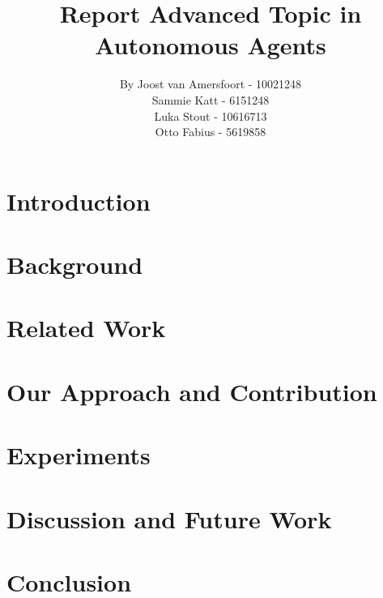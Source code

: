 \documentclass{article}
\title{Report Advanced Topic in Autonomous Agents}
\author{By Joost van Amersfoort - 10021248 \\ Sammie Katt - 6151248 \\ Luka Stout - 10616713 \\ Otto Fabius - 5619858}
\begin{document}
\maketitle
\tableofcontents
\newpage

\section{Introduction}


\section{Background}


\section{Related Work}


\section{Our Approach and Contribution}


\section{Experiments}


\section{Discussion and Future Work}


\section{Conclusion}

\end{document}
